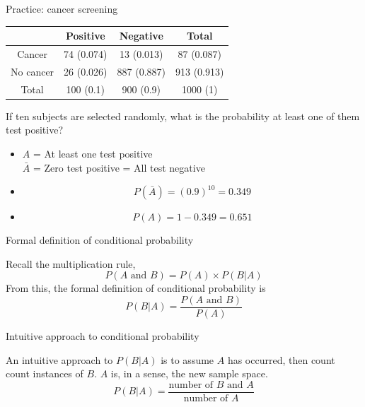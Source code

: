 \documentclass[xcolor=table]{beamer}
\begin{document}
\begin{frame}{Practice: cancer screening}
\begin{block}{}
{\centering \renewcommand{\arraystretch}{1}
\begin{tabular}{c | c  c | c}
 & Positive & Negative & Total \\
\hline
Cancer & 74 (0.074) & 13 (0.013) & 87 (0.087)\\
No cancer & 26 (0.026) & 887 (0.887) & 913 (0.913)\\
\hline
Total & 100 (0.1) & 900 (0.9) & 1000 (1)
\end{tabular}\par
\renewcommand{\arraystretch}{1.5}
}
\end{block}

\begin{exampleblock}{}
If ten subjects are selected randomly, what is the probability at least one of them test positive?
\begin{itemize}
\pause
\item $A$ = At least one test positive\\
$\bar A$ = Zero test positive = All test negative
\pause
\item  
\[P(\bar A) = (0.9)^{10} = 0.349\]
\vspace*{-\baselineskip}\pause
\item  
\[P(A) = 1 - 0.349  = 0.651\]
\end{itemize}
\end{exampleblock}

\end{frame}

\begin{frame}{Formal definition of conditional probability}

\begin{block}{}
Recall the multiplication rule,
\[P(A \text{ and } B) = P(A) \times P(B|A)\]
\pause
From this, the formal definition of conditional probability is
\[P(B|A) = \frac {P(A \text{ and } B)}{P(A)}\] 
\end{block}
\end{frame}

\begin{frame}{Intuitive approach to conditional probability}

\begin{block}{}
An intuitive approach to $P(B|A)$ is to assume $A$ has occurred, then count count instances of $B$. $A$ is, in a sense, the new sample space.
\[ P(B|A) = \frac{\text{number of $B$ and $A$}}{\text{number of $A$}}\]
\end{block}
\end{frame}
\end{document}
